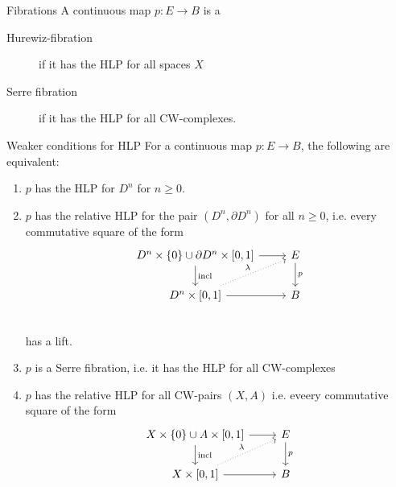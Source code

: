 \documentclass[language=english]{TemplateLecture}
\begin{document}
\begin{defi}{Fibrations}{}
    A continuous map \(p\colon E \to B\) is a
    \begin{description}
        \item[Hurewiz-fibration] if it has the HLP for all spaces \(X\)
        \item[Serre fibration] if it has the HLP for all CW-complexes.
    \end{description}
\end{defi}

\begin{thm}{Weaker conditions for HLP}{}
    For a continuous map \(p\colon E \to B\), the following are equivalent:
    \begin{enumerate}
        \item \(p\) has the HLP for \(D^n\) for \(n \geq 0\).
        \item \(p\) has the relative HLP for the pair \((D^n, \partial D^n)\) for all \(n \geq 0\), i.e. every commutative square of the form
        \[\begin{tikzcd}
            D^n \times \set 0 \cup \partial D^n \times [0,1] \ar[r] \ar[d, "\incl"] & E \ar[d, "p"] \\
            D^n \times [0,1] \ar[r] \ar[ru, dotted, "\lambda"] & B \\
        \end{tikzcd}\]
        has a lift.
        \item \(p\) is a Serre fibration, i.e. it has the HLP for all CW-complexes
        \item \(p\) has the relative HLP for all CW-pairs \((X,A)\) i.e. eveery commutative square of the form
        \[\begin{tikzcd}
            X \times \set 0 \cup A \times [0,1] \ar[r] \ar[d, "\incl"] & E \ar[d, "p"] \\
            X \times [0,1] \ar[r] \ar[ru, "\lambda", dotted] & B \\
        \end{tikzcd}\]
    \end{enumerate}
\end{thm}
\end{document}
